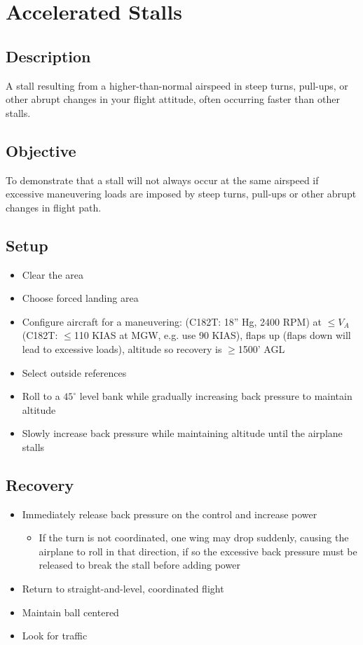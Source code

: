 \section{Accelerated Stalls}

\subsection{Description}

A stall resulting from a higher-than-normal airspeed in steep turns, pull-ups,
or other abrupt changes in your flight attitude, often occurring faster than
other stalls.

\subsection{Objective}

To demonstrate that a stall will not always occur at the same airspeed if
excessive maneuvering loads are imposed by steep turns, pull-ups or other
abrupt changes in flight path.

\subsection{Setup}

\begin{itemize}
  \item Clear the area
  \item Choose forced landing area
  \item Configure aircraft for a maneuvering: (C182T: 18'' Hg, 2400 RPM) at
    $\leq{}V_{A}$ (C182T: $\leq$110 KIAS at MGW, e.g. use 90 KIAS), flaps up
    (flaps down will lead to excessive loads), altitude so recovery is
    $\geq$1500' AGL
  \item Select outside references
  \item Roll to a $45^{\circ}$ level bank while gradually increasing back
    pressure to maintain altitude
  \item Slowly increase back pressure while maintaining altitude until the
    airplane stalls
\end{itemize}

\subsection{Recovery}

\begin{itemize}
  \item Immediately release back pressure on the control and increase power
    \begin{itemize}
      \item If the turn is not coordinated, one wing may drop suddenly, causing
        the airplane to roll in that direction, if so the excessive back
        pressure must be released to break the stall before adding power
    \end{itemize}
  \item Return to straight-and-level, coordinated flight
  \item Maintain ball centered
  \item Look for traffic
\end{itemize}

